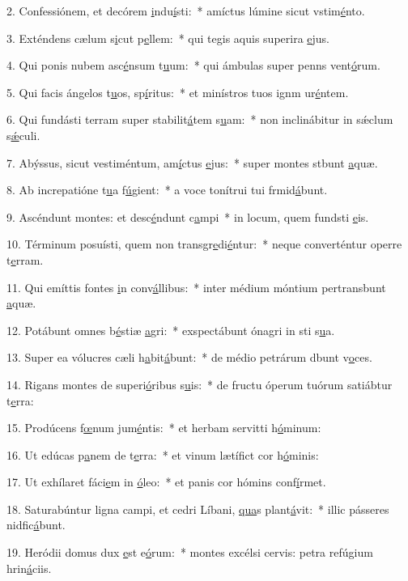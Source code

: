 2. Confessiónem, et decórem \uline{i}ndu\uline{í}sti:~* amíctus lúmine sicut vstim\uline{é}nto.\par 
3. Exténdens cælum s\uline{i}cut p\uline{e}llem:~* qui tegis aquis superira \uline{e}jus.\par 
4. Qui ponis nubem asc\uline{é}nsum t\uline{u}um:~* qui ámbulas super penns vent\uline{ó}rum.\par 
5. Qui facis ángelos t\uline{u}os, sp\uline{í}ritus:~* et minístros tuos ignm ur\uline{é}ntem.\par 
6. Qui fundásti terram super stabilit\uline{á}tem s\uline{u}am:~* non inclinábitur in sǽclum s\uline{ǽ}culi.\par 
7. Abýssus, sicut vestiméntum, am\uline{í}ctus \uline{e}jus:~* super montes stbunt \uline{a}quæ.\par 
8. Ab increpatióne t\uline{u}a f\uline{ú}gient:~* a voce tonítrui tui frmid\uline{á}bunt.\par 
9. Ascéndunt montes: et desc\uline{é}ndunt c\uline{a}mpi~* in locum, quem fundsti \uline{e}is.\par 
10. Términum posuísti, quem non transgr\uline{e}di\uline{é}ntur:~* neque converténtur operre t\uline{e}rram.\par 
11. Qui emíttis fontes \uline{i}n conv\uline{á}llibus:~* inter médium móntium pertransbunt \uline{a}quæ.\par 
12. Potábunt omnes b\uline{é}stiæ \uline{a}gri:~* exspectábunt ónagri in sti s\uline{u}a.\par 
13. Super ea vólucres cæli h\uline{a}bit\uline{á}bunt:~* de médio petrárum dbunt v\uline{o}ces.\par 
14. Rigans montes de superi\uline{ó}ribus s\uline{u}is:~* de fructu óperum tuórum satiábtur t\uline{e}rra:\par 
15. Prodúcens f\uline{œ}num jum\uline{é}ntis:~* et herbam servitti h\uline{ó}minum:\par 
16. Ut edúcas p\uline{a}nem de t\uline{e}rra:~* et vinum lætífict cor h\uline{ó}minis:\par 
17. Ut exhílaret fáci\uline{e}m in \uline{ó}leo:~* et panis cor hómins conf\uline{í}rmet.\par 
18. Saturabúntur ligna campi, et cedri Líbani, \uline{qua}s plant\uline{á}vit:~* illic pásseres nidfic\uline{á}bunt.\par 
19. Heródii domus dux \uline{e}st e\uline{ó}rum:~* montes excélsi cervis: petra refúgium hrin\uline{á}ciis.\par 
